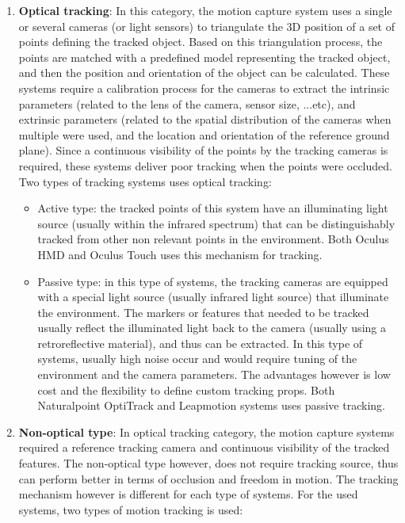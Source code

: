 \begin{enumerate}
\item \textbf{Optical tracking}: In this category, the motion capture system uses a single or several cameras (or light sensors) to triangulate the 3D position of a set of points defining the tracked object. Based on this triangulation process, the points are matched with a predefined model representing the tracked object, and then the position and orientation of the object can be calculated. These systems require a calibration process for the cameras to extract the intrinsic parameters (related to the lens of the camera, sensor size, ...etc), and extrinsic parameters (related to the spatial distribution of the cameras when multiple were used, and the location and orientation of the reference ground plane). Since a continuous visibility of the points by the tracking cameras is required, these systems deliver poor tracking when the points were occluded. \\
Two types of tracking systems uses optical tracking:

\begin{itemize}
\item Active type: the tracked points of this system have an illuminating light source (usually within the infrared spectrum) that can be distinguishably tracked from other non relevant points in the environment. Both Oculus HMD and Oculus Touch uses this mechanism for tracking.

\item Passive type: in this type of systems, the tracking cameras are equipped with a special light source (usually infrared light source) that illuminate the environment. The markers or features that needed to be tracked usually reflect the illuminated light back to the camera (usually using a retroreflective material), and thus can be extracted. In this type of systems, usually high noise occur and would require tuning of the environment and the camera parameters. The advantages however is low cost and the flexibility to define custom tracking props. Both Naturalpoint OptiTrack and Leapmotion systems uses passive tracking.
\end{itemize}

\item \textbf{Non-optical type}: In optical tracking category, the motion capture systems required a reference tracking camera and continuous visibility of the tracked features. The non-optical type however, does not require tracking source, thus can perform better in terms of occlusion and freedom in motion. The tracking mechanism however is different for each type of systems. For the used systems, two types of motion tracking is used:


\end{enumerate}
